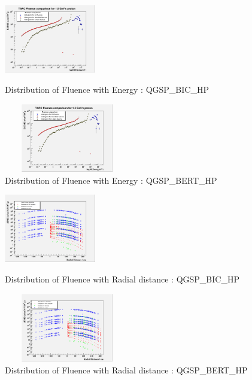 \documentclass[twocolumn,amsmath,amssymb]{snp}
\begin{document}
\begin{figure}
    \centering 
    \begin{minipage}[b]{0.4\textwidth}
        \includegraphics [height=30mm, width=55 mm] {FluenceEnergyBIC.png}
        \caption{\small Distribution of Fluence with Energy : QGSP\_BIC\_HP}
    \end{minipage}
    \begin{minipage}[b]{0.4\textwidth}
        \includegraphics [height=30mm, width=55mm] {FluenceEnergyBERT.png}
        \caption{\small Distribution of Fluence with Energy : QGSP\_BERT\_HP}
    \end{minipage}
\end{figure}

\begin{figure}
    \centering 
    \begin{minipage}[b]{0.4\textwidth}
        \includegraphics [height=30mm, width=55 mm] {FluenceRadialDistBIC.png}
        \caption{\small Distribution of Fluence with Radial distance : QGSP\_BIC\_HP}
    \end{minipage}
    \begin{minipage}[b]{0.4\textwidth}
        \includegraphics [height=30mm, width=55mm] {FluenceRadialDistBERT.png}
        \caption{\small Distribution of Fluence with Radial distance : QGSP\_BERT\_HP}
    \end{minipage}
\end{figure}
\end{document}
